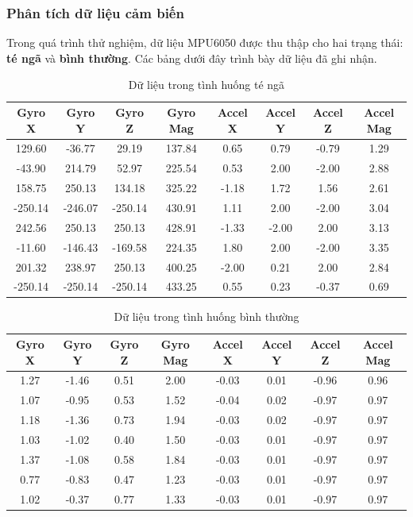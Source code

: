 \subsubsection*{Phân tích dữ liệu cảm biến}
Trong quá trình thử nghiệm, dữ liệu MPU6050 được thu thập cho hai trạng thái: \textbf{té ngã} và \textbf{bình thường}.  
Các bảng dưới đây trình bày dữ liệu đã ghi nhận.

\begin{table}[h]
\centering
\caption{Dữ liệu trong tình huống té ngã}
\label{tab:fall_data}
\begin{tabular}{|c|c|c|c|c|c|c|c|}
\hline
\textbf{Gyro X} & \textbf{Gyro Y} & \textbf{Gyro Z} & \textbf{Gyro Mag} & \textbf{Accel X} & \textbf{Accel Y} & \textbf{Accel Z} & \textbf{Accel Mag} \\
\hline
129.60 & -36.77 & 29.19 & 137.84 & 0.65 & 0.79 & -0.79 & 1.29 \\
-43.90 & 214.79 & 52.97 & 225.54 & 0.53 & 2.00 & -2.00 & 2.88 \\
158.75 & 250.13 & 134.18 & 325.22 & -1.18 & 1.72 & 1.56 & 2.61 \\
-250.14 & -246.07 & -250.14 & 430.91 & 1.11 & 2.00 & -2.00 & 3.04 \\
242.56 & 250.13 & 250.13 & 428.91 & -1.33 & -2.00 & 2.00 & 3.13 \\
-11.60 & -146.43 & -169.58 & 224.35 & 1.80 & 2.00 & -2.00 & 3.35 \\
201.32 & 238.97 & 250.13 & 400.25 & -2.00 & 0.21 & 2.00 & 2.84 \\
-250.14 & -250.14 & -250.14 & 433.25 & 0.55 & 0.23 & -0.37 & 0.69 \\
\hline
\end{tabular}
\end{table}

\begin{table}[h]
\centering
\caption{Dữ liệu trong tình huống bình thường}
\label{tab:normal_data}
\begin{tabular}{|c|c|c|c|c|c|c|c|}
\hline
\textbf{Gyro X} & \textbf{Gyro Y} & \textbf{Gyro Z} & \textbf{Gyro Mag} & \textbf{Accel X} & \textbf{Accel Y} & \textbf{Accel Z} & \textbf{Accel Mag} \\
\hline
1.27 & -1.46 & 0.51 & 2.00 & -0.03 & 0.01 & -0.96 & 0.96 \\
1.07 & -0.95 & 0.53 & 1.52 & -0.04 & 0.02 & -0.97 & 0.97 \\
1.18 & -1.36 & 0.73 & 1.94 & -0.03 & 0.02 & -0.97 & 0.97 \\
1.03 & -1.02 & 0.40 & 1.50 & -0.03 & 0.01 & -0.97 & 0.97 \\
1.37 & -1.08 & 0.58 & 1.84 & -0.03 & 0.01 & -0.97 & 0.97 \\
0.77 & -0.83 & 0.47 & 1.23 & -0.03 & 0.01 & -0.97 & 0.97 \\
1.02 & -0.37 & 0.77 & 1.33 & -0.03 & 0.01 & -0.97 & 0.97 \\
\hline
\end{tabular}
\end{table}

